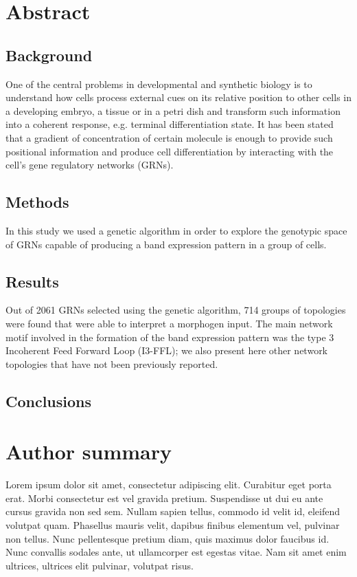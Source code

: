\documentclass[10pt,letterpaper]{article}
\begin{document}
\section*{Abstract}

\subsection*{Background}
One of the central problems in developmental and synthetic biology is to 
understand how cells process external cues on its relative position to other 
cells in a developing embryo, a tissue or in a petri dish and transform such
information into a coherent response, e.g. terminal differentiation state. It 
has been stated that a gradient of concentration of certain molecule is enough 
to provide such positional information and produce cell differentiation by 
interacting with the cell's gene regulatory networks (GRNs).

\subsection*{Methods}
In this study we used a genetic algorithm in order to explore the genotypic 
space of GRNs capable of producing a band expression pattern in a group of 
cells.

\subsection*{Results}
Out of 2061 GRNs selected using the genetic algorithm, 714 groups of 
topologies were found that were able to interpret a morphogen input. The 
main network motif involved in the formation of the band expression pattern 
was the type 3 Incoherent Feed Forward Loop (I3-FFL); we also present here 
other network topologies that have not been previously reported.

\subsection*{Conclusions}


\section*{Author summary}
Lorem ipsum dolor sit amet, consectetur adipiscing elit. Curabitur eget porta 
erat. Morbi consectetur est vel gravida pretium. Suspendisse ut dui eu ante 
cursus gravida non sed sem. Nullam sapien tellus, commodo id velit id, eleifend 
volutpat quam. Phasellus mauris velit, dapibus finibus elementum vel, pulvinar 
non tellus. Nunc pellentesque pretium diam, quis maximus dolor faucibus id. Nunc
convallis sodales ante, ut ullamcorper est egestas vitae. Nam sit amet enim 
ultrices, ultrices elit pulvinar, volutpat risus.
\end{document}
